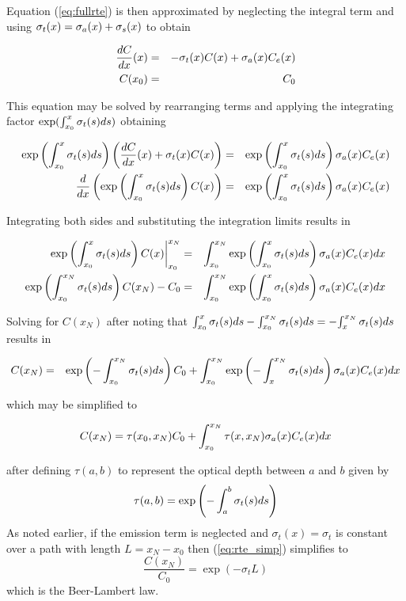 Equation (\ref{eq:fullrte}) is then approximated by neglecting the integral term and using $\sigma_t(x)=\sigma_a(x)+\sigma_s(x)$ to obtain

\begin{eqnarray}
\label{eq:simple_rte}
\frac{dC}{dx}(x)&=&-\sigma_t(x) C(x) + \sigma_a(x) C_e(x)\\
 C(x_0)&=&C_0\nonumber
\end{eqnarray}

This equation may be solved by rearranging terms and applying the integrating factor $\exp(\int_{x_0}^x \sigma_t(s) ds)$ obtaining

\begin{eqnarray*}
\exp\left({\int_{x_0}^{x} \sigma_t(s) ds}\right)\left(\frac{dC}{dx}(x)+\sigma_t(x) C(x)\right)&=&  \exp\left({\int_{x_0}^{x} \sigma_t(s) ds}\right)\sigma_a(x) C_e(x)\\
\frac{d}{dx}\left(\exp\left({\int_{x_0}^{x} \sigma_t(s) ds}\right) C(x)\right)&=& \exp\left({\int_{x_0}^{x} \sigma_t(s) ds}\right)\sigma_a(x) C_e(x)
\end{eqnarray*}

Integrating both sides and substituting the integration limits results in

\begin{eqnarray*}
\left.\exp\left({\int_{x_0}^{x} \sigma_t(s) ds}\right) C(x)\right|_{x_0}^{x_N}&=& \int_{x_0}^{x_N}\exp\left({\int_{x_0}^{x} \sigma_t(s) ds}\right)\sigma_a(x) C_e(x) dx \\
\exp\left({\int_{x_0}^{x_N} \sigma_t(s) ds}\right) C(x_N)-C_0&=& \int_{x_0}^{x_N}\exp\left({\int_{x_0}^{x} \sigma_t(s) ds}\right)\sigma_a(x) C_e(x) dx
\end{eqnarray*}

Solving for $C(x_N)$ after noting that ${\int_{x_0}^{x} \sigma_t(s) ds}-{\int_{x_0}^{x_N} \sigma_t(s) ds}=-{\int_{x}^{x_N} \sigma_t(s) ds}$ results in

\begin{eqnarray*}
C(x_N)&=&\exp\left({-\int_{x_0}^{x_N} \sigma_t(s) ds}\right) C_0+ \int_{x_0}^{x_N}\exp\left({-\int_{x}^{x_N} \sigma_t(s) ds}\right)\sigma_a(x) C_e(x) dx\\
\end{eqnarray*}

which may be simplified to

\begin{equation}
\label{eq:rte_simp}
\label{eq:rtesoln}
 C(x_N)=\tau(x_0,x_N)C_0 + \int_{x_0}^{x_N}\tau(x,x_N)\sigma_a(x)C_e(x) dx
\end{equation}

after defining $\tau(a,b)$ to represent the optical depth between $a$ and $b$ given by
\begin{equation}
\label{eq:optdepth}
\tau(a,b)=\exp\left({-\int_{a}^{b} \sigma_t(s) ds}\right)
\end{equation}
As noted earlier, if the emission term is neglected and $\sigma_t(x)=\sigma_t$ is constant over a path with length
$L=x_N-x_0$ then (\ref{eq:rte_simp}) simplifies to
\begin{equation}
\label{eq:rte_simp2}
 \frac{C(x_N)}{C_0}=\exp(-\sigma_tL)
\end{equation}
which is the Beer-Lambert law.

